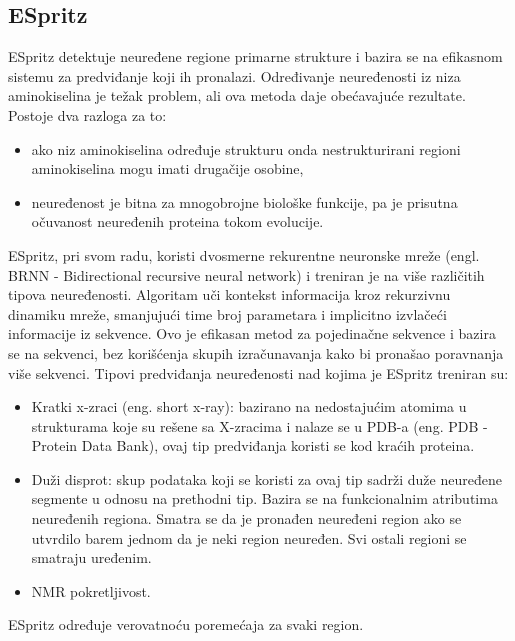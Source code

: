 \subsection{ESpritz}
ESpritz detektuje neuređene regione primarne strukture i bazira se na efikasnom sistemu za predviđanje koji ih pronalazi. Određivanje neuređenosti iz niza aminokiselina je težak problem, ali ova metoda daje obećavajuće rezultate. Postoje dva razloga za to:
\begin{itemize}
\item  ako niz aminokiselina određuje strukturu onda nestrukturirani regioni aminokiselina mogu imati drugačije osobine, 
\item neuređenost je bitna za mnogobrojne biološke funkcije, pa je prisutna očuvanost neuređenih proteina tokom evolucije. 
\end{itemize}

ESpritz, pri svom radu, koristi dvosmerne rekurentne neuronske mreže (engl. BRNN - Bidirectional recursive neural network) i treniran je na više različitih tipova neuređenosti. Algoritam uči kontekst informacija kroz rekurzivnu dinamiku mreže, smanjujući time broj parametara i implicitno izvlačeći informacije iz sekvence. Ovo je efikasan metod za pojedinačne sekvence i bazira se na sekvenci, bez korišćenja skupih izračunavanja kako bi pronašao poravnanja više sekvenci. Tipovi predviđanja neuređenosti nad kojima je ESpritz treniran su:
\begin{itemize}
\item Kratki x-zraci (eng. short x-ray): bazirano na nedostajućim atomima u strukturama koje su rešene sa X-zracima i nalaze se u PDB-a (eng. PDB - Protein Data Bank), ovaj tip predviđanja koristi se kod kraćih proteina. 
\item Duži disprot: skup podataka koji se koristi za ovaj tip sadrži duže neuređene segmente u odnosu na prethodni tip. Bazira se na funkcionalnim atributima neuređenih regiona. Smatra se da je pronađen neuređeni region ako se utvrdilo barem jednom da je neki region neuređen. Svi ostali regioni se smatraju uređenim.
\item NMR pokretljivost.
\end{itemize}
ESpritz određuje verovatnoću poremećaja za svaki region. ~\cite{ESpritzAFPD, ESpritzEP, ESpritz2, ESpritz3}



